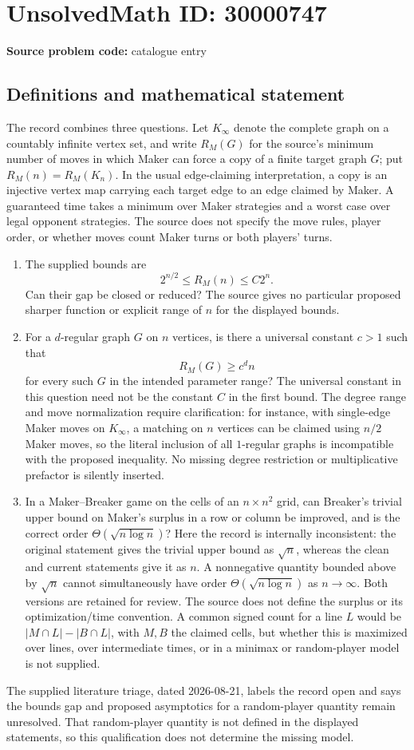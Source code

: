 \documentclass[11pt]{article}
\begin{document}
\section*{UnsolvedMath ID: 30000747}
\textbf{Source problem code:} catalogue entry
\subsection{Definitions and mathematical statement}
The record combines three questions. Let $K_\infty$ denote the complete graph on a countably infinite vertex set, and write $R_M(G)$ for the source's minimum number of moves in which Maker can force a copy of a finite target graph $G$; put $R_M(n)=R_M(K_n)$. In the usual edge-claiming interpretation, a copy is an injective vertex map carrying each target edge to an edge claimed by Maker. A guaranteed time takes a minimum over Maker strategies and a worst case over legal opponent strategies. The source does not specify the move rules, player order, or whether moves count Maker turns or both players' turns.\begin{enumerate}\item The supplied bounds are \[2^{n/2}\leq R_M(n)\leq C2^n.\] Can their gap be closed or reduced? The source gives no particular proposed sharper function or explicit range of $n$ for the displayed bounds.\item For a $d$-regular graph $G$ on $n$ vertices, is there a universal constant $c>1$ such that \[R_M(G)\geq c^d n\] for every such $G$ in the intended parameter range? The universal constant in this question need not be the constant $C$ in the first bound. The degree range and move normalization require clarification: for instance, with single-edge Maker moves on $K_\infty$, a matching on $n$ vertices can be claimed using $n/2$ Maker moves, so the literal inclusion of all $1$-regular graphs is incompatible with the proposed inequality. No missing degree restriction or multiplicative prefactor is silently inserted.\item In a Maker--Breaker game on the cells of an $n\times n^2$ grid, can Breaker's trivial upper bound on Maker's surplus in a row or column be improved, and is the correct order $\Theta(\sqrt{n\log n})$? Here the record is internally inconsistent: the original statement gives the trivial upper bound as $\sqrt n$, whereas the clean and current statements give it as $n$. A nonnegative quantity bounded above by $\sqrt n$ cannot simultaneously have order $\Theta(\sqrt{n\log n})$ as $n\to\infty$. Both versions are retained for review. The source does not define the surplus or its optimization/time convention. A common signed count for a line $L$ would be $|M\cap L|-|B\cap L|$, with $M,B$ the claimed cells, but whether this is maximized over lines, over intermediate times, or in a minimax or random-player model is not supplied.\end{enumerate} The supplied literature triage, dated 2026-08-21, labels the record open and says the bounds gap and proposed asymptotics for a random-player quantity remain unresolved. That random-player quantity is not defined in the displayed statements, so this qualification does not determine the missing model.
\end{document}

